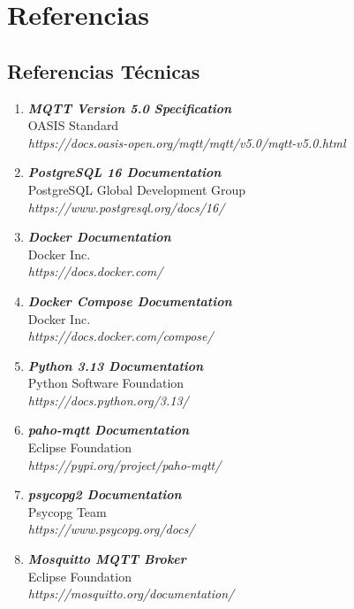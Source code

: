 \chapter{Referencias}

\section{Referencias Técnicas}

\begin{enumerate}

    \item \textbf{\textit{MQTT Version 5.0 Specification}}\\
    OASIS Standard \\
    \textit{https://docs.oasis-open.org/mqtt/mqtt/v5.0/mqtt-v5.0.html}

    \item \textbf{\textit{PostgreSQL 16 Documentation}}\\
    PostgreSQL Global Development Group \\
    \textit{https://www.postgresql.org/docs/16/}

    \item \textbf{\textit{Docker Documentation}}\\
    Docker Inc. \\
    \textit{https://docs.docker.com/}

    \item \textbf{\textit{Docker Compose Documentation}}\\
    Docker Inc. \\
    \textit{https://docs.docker.com/compose/}

    \item \textbf{\textit{Python 3.13 Documentation}}\\
    Python Software Foundation \\
    \textit{https://docs.python.org/3.13/}

    \item \textbf{\textit{paho-mqtt Documentation}}\\
    Eclipse Foundation \\
    \textit{https://pypi.org/project/paho-mqtt/}

    \item \textbf{\textit{psycopg2 Documentation}}\\
    Psycopg Team \\
    \textit{https://www.psycopg.org/docs/}

    \item \textbf{\textit{Mosquitto MQTT Broker}}\\
    Eclipse Foundation \\
    \textit{https://mosquitto.org/documentation/}


\end{enumerate}
